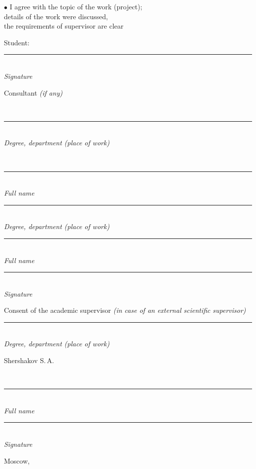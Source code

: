\documentclass[12pt,a4paper]{article}
\newcommand{\hseSignField}[2]{%
  \begin{minipage}[t]{#1}\centering
    \rule{\linewidth}{0.4pt}\\[-2pt]{\footnotesize\itshape #2}
  \end{minipage}}
\newcommand{\hseFilledField}[3]{%
  \begin{minipage}[t]{#1}\centering
    {\small\strut #2}\\[-4pt]\rule{\linewidth}{0.4pt}\\[-2pt]{\footnotesize\itshape #3}
  \end{minipage}}
\begin{document}
\begin{otherlanguage}{english}
\vspace{0.5cm}
\begin{minipage}[t]{0.55\textwidth}
$\bullet$ I agree with the topic of the work (project);\\
details of the work were discussed,\\
the requirements of supervisor are clear
\end{minipage}\hfill
\begin{minipage}[t]{0.4\textwidth}
\vspace{0.5cm}
Student: \hfill \hseSignField{0.5\textwidth}{Signature}
\end{minipage}

\vspace{0.5cm}
\begin{minipage}[t]{0.27\textwidth}\raggedright Consultant {\itshape(if any)}\end{minipage}%
\ifhseHasCoSupervisor
\hseFilledField{0.3\textwidth}{\foreignlanguage{russian}{\hseCoSupervisorTitle\ifdefempty{\hseCoSupervisorDegree}{}{, \hseCoSupervisorDegree}}}{Degree, department (place of work)}\hfill
\hseFilledField{0.22\textwidth}{\foreignlanguage{russian}{\hseCoSupervisorName}}{Full name}\hfill
\else
\hseSignField{0.3\textwidth}{Degree, department (place of work)}\hfill
\hseSignField{0.22\textwidth}{Full name}\hfill
\fi
\hseSignField{0.15\textwidth}{Signature}

\vspace{0.5cm}
\begin{minipage}[t]{0.27\textwidth}\raggedright Consent of the academic supervisor {\itshape(in case of an external scientific supervisor)}\end{minipage}%
\hseSignField{0.3\textwidth}{Degree, department (place of work)}\hfill
\hseFilledField{0.22\textwidth}{Shershakov S.\,A.}{Full name}\hfill
\hseSignField{0.15\textwidth}{Signature}

\vfill
\begin{center}Moscow, \the\year\end{center}
\end{otherlanguage}
\end{document}
